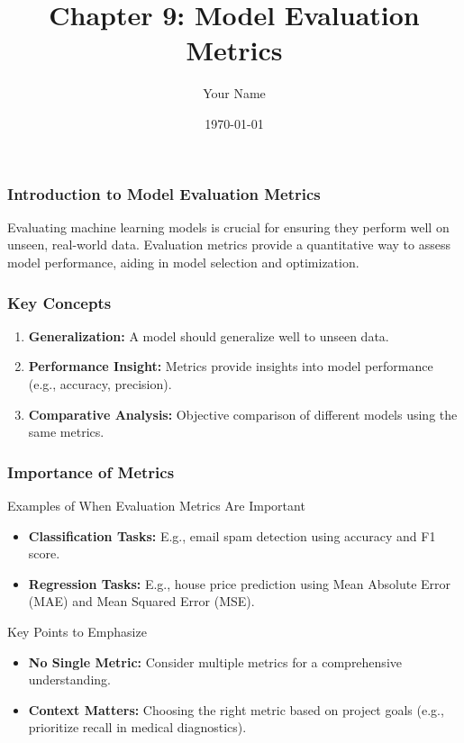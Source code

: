 \documentclass{beamer}
\title{Chapter 9: Model Evaluation Metrics}
\author{Your Name}
\institute{Your Institution}
\date{\today}
\begin{document}
\frame{\titlepage}

\begin{frame}[fragile]
    \frametitle{Introduction to Model Evaluation Metrics}
    Evaluating machine learning models is crucial for ensuring they perform well on unseen, real-world data. 
    Evaluation metrics provide a quantitative way to assess model performance, aiding in model selection and optimization.
\end{frame}

\begin{frame}[fragile]
    \frametitle{Key Concepts}
    \begin{enumerate}
        \item \textbf{Generalization:} A model should generalize well to unseen data.
        \item \textbf{Performance Insight:} Metrics provide insights into model performance (e.g., accuracy, precision).
        \item \textbf{Comparative Analysis:} Objective comparison of different models using the same metrics.
    \end{enumerate}
\end{frame}

\begin{frame}[fragile]
    \frametitle{Importance of Metrics}
    \begin{block}{Examples of When Evaluation Metrics Are Important}
        \begin{itemize}
            \item \textbf{Classification Tasks:} E.g., email spam detection using accuracy and F1 score.
            \item \textbf{Regression Tasks:} E.g., house price prediction using Mean Absolute Error (MAE) and Mean Squared Error (MSE).
        \end{itemize}
    \end{block}
    
    \begin{block}{Key Points to Emphasize}
        \begin{itemize}
            \item \textbf{No Single Metric:} Consider multiple metrics for a comprehensive understanding.
            \item \textbf{Context Matters:} Choosing the right metric based on project goals (e.g., prioritize recall in medical diagnostics).
        \end{itemize}
    \end{block}
\end{frame}
\end{document}

